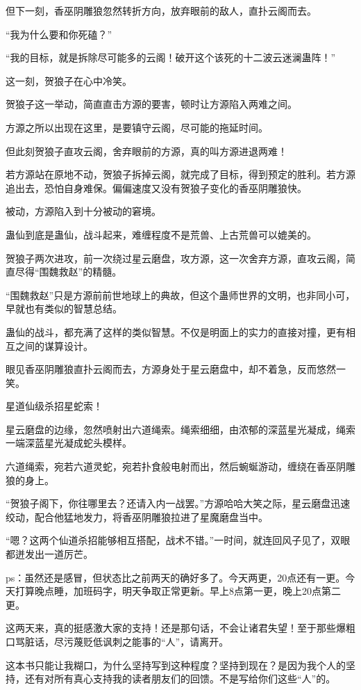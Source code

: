 \begin{this_body}
但下一刻，香巫阴雕狼忽然转折方向，放弃眼前的敌人，直扑云阁而去。

“我为什么要和你死磕？”

“我的目标，就是拆除尽可能多的云阁！破开这个该死的十二波云迷澜蛊阵！”

这一刻，贺狼子在心中冷笑。

贺狼子这一举动，简直直击方源的要害，顿时让方源陷入两难之间。

方源之所以出现在这里，是要镇守云阁，尽可能的拖延时间。

但此刻贺狼子直攻云阁，舍弃眼前的方源，真的叫方源进退两难！

若方源站在原地不动，贺狼子拆掉云阁，就完成了目标，得到预定的胜利。若方源追出去，恐怕自身难保。偏偏速度又没有贺狼子变化的香巫阴雕狼快。

被动，方源陷入到十分被动的窘境。

蛊仙到底是蛊仙，战斗起来，难缠程度不是荒兽、上古荒兽可以媲美的。

贺狼子两次进攻，前一次绕过星云磨盘，攻方源，这一次舍弃方源，直攻云阁，简直尽得“围魏救赵”的精髓。

“围魏救赵”只是方源前前世地球上的典故，但这个蛊师世界的文明，也非同小可，早就也有类似的智慧总结。

蛊仙的战斗，都充满了这样的类似智慧。不仅是明面上的实力的直接对撞，更有相互之间的谋算设计。

眼见香巫阴雕狼直扑云阁而去，方源身处于星云磨盘中，却不着急，反而悠然一笑。

星道仙级杀招星蛇索！

星云磨盘的边缘，忽然喷射出六道绳索。绳索细细，由浓郁的深蓝星光凝成，绳索一端深蓝星光凝成蛇头模样。

六道绳索，宛若六道灵蛇，宛若扑食般电射而出，然后蜿蜒游动，缠绕在香巫阴雕狼的身上。

“贺狼子阁下，你往哪里去？还请入内一战罢。”方源哈哈大笑之际，星云磨盘迅速绞动，配合他猛地发力，将香巫阴雕狼拉进了星魔磨盘当中。

“嗯？这两个仙道杀招能够相互搭配，战术不错。”一时间，就连回风子见了，双眼都迸发出一道厉芒。

ps：虽然还是感冒，但状态比之前两天的确好多了。今天两更，20点还有一更。今天打算晚点睡，加班码字，明天争取正常更新。早上8点第一更，晚上20点第二更。

这两天来，真的挺感激大家的支持！还是那句话，不会让诸君失望！至于那些爆粗口骂脏话，尽污蔑贬低讽刺之能事的“人”，请离开。

这本书只能让我糊口，为什么坚持写到这种程度？坚持到现在？是因为我个人的坚持，还有对所有真心支持我的读者朋友们的回馈。不是写给你们这些“人”的。

\end{this_body}

